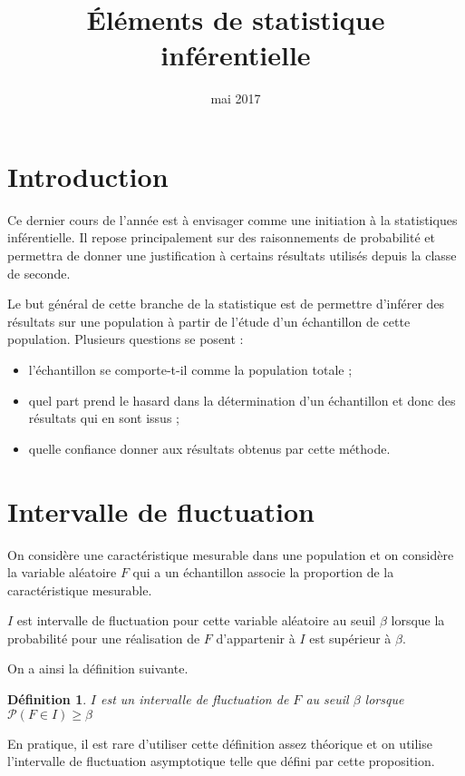 \documentclass[10pt,a4paper,french]{article}
\title{Éléments de statistique inférentielle}
\author{\bsc{Jumel}}
\date{mai 2017}
\makeatletter
\renewcommand{\maketitle}%
{\framebox{%
    \begin{minipage}{1.0\linewidth}%
      \begin{center}%
        \Large \@title ~-- \@author \\%
        \@date%
      \end{center}%
    \end{minipage}}%
  \normalsize%
}
\newcommand{\p}{\mathcal{P}}
\theoremstyle{break}
\newtheorem{definition}{Définition}
\theoremstyle{plain}
\theoremstyle{nonumberplain}
\theoremstyle{nonumberbreak}
\makeatother
\begin{document}
\noindent\maketitle


\section*{Introduction}

Ce dernier cours de l'année est à envisager comme une initiation à la
statistiques inférentielle. Il repose principalement sur des
raisonnements de probabilité et permettra de donner une justification à
certains résultats utilisés depuis la classe de seconde.

Le but général de cette branche de la statistique est de permettre
d'inférer des résultats sur une population à partir de l'étude d'un
échantillon de cette population. Plusieurs questions se posent :
\begin{itemize}
  \item l'échantillon se comporte-t-il comme la population totale ;
  \item quel part prend le hasard dans la détermination d'un échantillon
    et donc des résultats qui en sont issus ;
  \item quelle confiance donner aux résultats obtenus par cette méthode.
\end{itemize}

\section{Intervalle de fluctuation}

On considère une caractéristique mesurable dans une population et on
considère la variable aléatoire $F$ qui a un échantillon associe la
proportion de la caractéristique mesurable.

$I$ est intervalle de fluctuation pour cette variable aléatoire au seuil
$\beta$ lorsque la probabilité pour une réalisation de $F$ d'appartenir
à $I$ est supérieur à $\beta$.

On a ainsi la définition suivante.

\begin{definition}
  $I$ est un intervalle de fluctuation de $F$ au seuil $\beta$ lorsque
  $\p(F \in I) \geqslant \beta$
\end{definition}

En pratique, il est rare d'utiliser cette définition assez théorique et
on utilise l'intervalle de fluctuation asymptotique telle que défini par
cette proposition.
\end{document}
